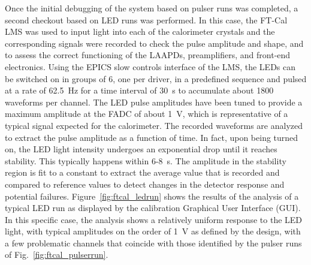 Once the initial debugging of the system based on pulser runs was completed, a second checkout based on LED runs
was performed. In this case, the FT-Cal LMS was used to input light into each of the calorimeter crystals and the
corresponding signals were recorded to check the pulse amplitude and shape, and to assess the correct functioning of
the LAAPDs, preamplifiers, and front-end electronics. Using the EPICS slow controls interface of the LMS, the LEDs
can be switched on in groups of 6, one per driver, in a predefined sequence and pulsed at a rate of 62.5~Hz for a time
interval of 30~s to accumulate about 1800 waveforms per channel. The LED pulse amplitudes have been tuned to
provide a maximum amplitude at the FADC of about 1~V, which is representative of a typical signal expected for the
calorimeter. The recorded waveforms are analyzed to extract the pulse amplitude as a function of time. In fact, upon
being turned on, the LED light intensity undergoes an exponential drop until it reaches stability. This typically happens
within 6-8~s. The amplitude in the stability region is fit to a constant to extract the average value that is recorded
and compared to reference values to detect changes in the detector response and potential failures.
Figure~\ref{fig:ftcal_ledrun} shows the results of the analysis of a typical LED run as displayed by the calibration
Graphical User Interface (GUI). In this specific case, the analysis shows a relatively uniform response to the LED light,
with typical amplitudes on the order of 1~V as defined by the design, with a few problematic channels that coincide with
those identified by the pulser runs of Fig.~\ref{fig:ftcal_pulserrun}. 

